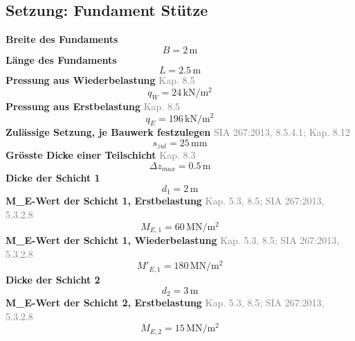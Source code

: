 \documentclass[11pt,a4paper]{article}
\newcommand{\normref}[1]{{\small\textcolor{gray}{#1}}}
\begin{document}
\subsection{Setzung: Fundament Stütze}
\noindent\textbf{Breite des Fundaments}
\begin{equation*}
B = 2\,\mathrm{m}
\end{equation*}
\noindent\textbf{Länge des Fundaments}
\begin{equation*}
L = 2.5\,\mathrm{m}
\end{equation*}
\noindent\textbf{Pressung aus Wiederbelastung} \hfill \normref{Kap. 8.5}
\begin{equation*}
q_W = 24\,\mathrm{kN}/\mathrm{m}^{2}
\end{equation*}
\noindent\textbf{Pressung aus Erstbelastung} \hfill \normref{Kap. 8.5}
\begin{equation*}
q_E = 196\,\mathrm{kN}/\mathrm{m}^{2}
\end{equation*}
\noindent\textbf{Zulässige Setzung, je Bauwerk festzulegen} \hfill \normref{SIA 267:2013, 8.5.4.1; Kap. 8.12}
\begin{equation*}
s_{zul} = 25\,\mathrm{mm}
\end{equation*}
\noindent\textbf{Grösste Dicke einer Teilschicht} \hfill \normref{Kap. 8.3}
\begin{equation*}
\Delta z_{max} = 0.5\,\mathrm{m}
\end{equation*}
\noindent\textbf{Dicke der Schicht 1}
\begin{equation*}
d_{1} = 2\,\mathrm{m}
\end{equation*}
\noindent\textbf{M\_E-Wert der Schicht 1, Erstbelastung} \hfill \normref{Kap. 5.3, 8.5; SIA 267:2013, 5.3.2.8}
\begin{equation*}
M_{E,1} = 60\,\mathrm{MN}/\mathrm{m}^{2}
\end{equation*}
\noindent\textbf{M\_E-Wert der Schicht 1, Wiederbelastung} \hfill \normref{Kap. 5.3, 8.5; SIA 267:2013, 5.3.2.8}
\begin{equation*}
M'_{E,1} = 180\,\mathrm{MN}/\mathrm{m}^{2}
\end{equation*}
\noindent\textbf{Dicke der Schicht 2}
\begin{equation*}
d_{2} = 3\,\mathrm{m}
\end{equation*}
\noindent\textbf{M\_E-Wert der Schicht 2, Erstbelastung} \hfill \normref{Kap. 5.3, 8.5; SIA 267:2013, 5.3.2.8}
\begin{equation*}
M_{E,2} = 15\,\mathrm{MN}/\mathrm{m}^{2}
\end{equation*}
\end{document}
